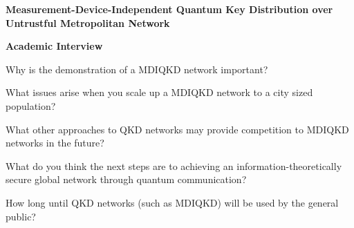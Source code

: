 \documentclass{exam}
\begin{document}
\begin{EnvFullwidth}
\Large \centering \textbf{Measurement-Device-Independent Quantum Key Distribution over Untrustful Metropolitan Network}
\end{EnvFullwidth}

\begin{EnvFullwidth}
\centering \textbf{Academic Interview}
\end{EnvFullwidth}

\begin{questions}
\question
Why is the demonstration of a MDIQKD network important?
\fillwithlines{1in}

\question
What issues arise when you scale up a MDIQKD network to a city sized population? 
\fillwithlines{1in}

\question
What other approaches to QKD networks may provide competition to MDIQKD networks in the future? 
\fillwithlines{1in}

\question
What do you think the next steps are to achieving an information-theoretically secure global network through quantum communication? 
\fillwithlines{1in}


\question
How long until QKD networks (such as MDIQKD) will be used by the general public? 
\fillwithlines{1in}
\end{questions}
\end{document}
